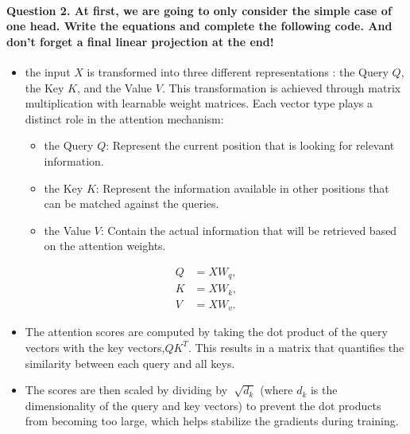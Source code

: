 \documentclass{article}
\begin{document}
\paragraph{Question 2. At first, we are going to only consider the simple case of one head. Write the equations and complete the following code. And don't forget a final linear projection at the end!
 }

\begin{itemize}
    \item   the input $ X $ is transformed into three different representations : the Query $ Q $, the Key $ K $, and the Value $ V $. This transformation is achieved through matrix multiplication with learnable weight matrices. Each vector type plays a distinct role in the attention mechanism:  
    \begin{itemize}
        \item the Query $ Q $: Represent the current position that is looking for relevant information.
        \item the Key $ K $: Represent the information available in other positions that can be matched against the queries. 
        \item  the Value $ V $: Contain the actual information that will be retrieved based on the attention weights. 
    \end{itemize}
\end{itemize}

\begin{align*}
    Q & = X W_q,  \\
    K & = X W_k, \\
    V & = X W_v.
\end{align*}


\begin{itemize}
    \item The attention scores are computed by taking the dot product of the query vectors with the key vectors,$ Q K^T$. This results in a matrix that quantifies the similarity between each query and all keys.
\end{itemize}

\begin{itemize}
    \item The scores are then scaled by dividing by $ \sqrt[]{d_k} $ (where $ d_k $  is the dimensionality of the query and key vectors)  to prevent the dot products from becoming too large, which helps stabilize the gradients during training.
\end{itemize}
\end{document}
